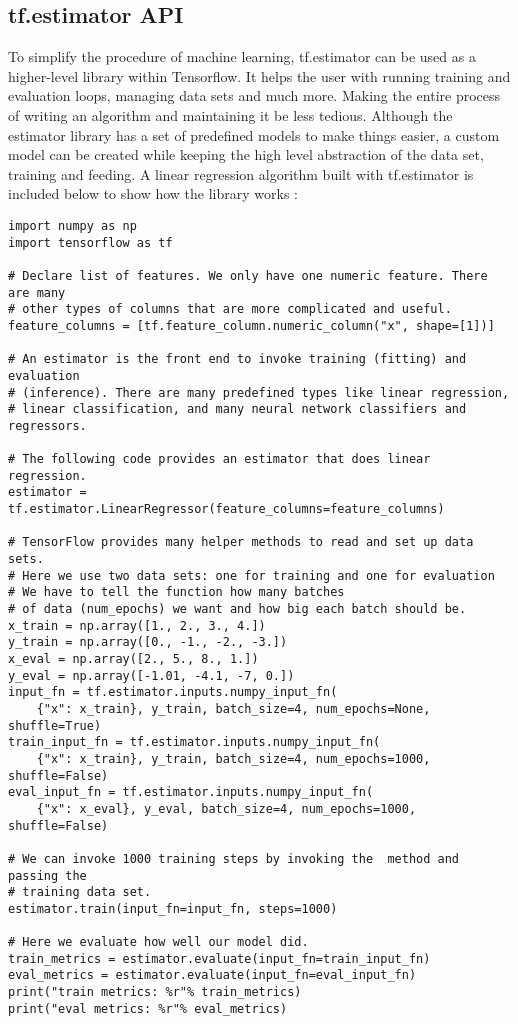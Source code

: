 \subsection{tf.estimator API}
To simplify the procedure of machine learning,
tf.estimator can be used as a higher-level library within Tensorflow.
It helps the user with running training and evaluation loops, managing data sets and much more. 
Making the entire process of writing an algorithm and maintaining it be less tedious.
Although the estimator library has a set of predefined models to make things easier, a custom model can be created while keeping the high
level abstraction of the data set, training and feeding.
A linear regression algorithm built with tf.estimator is included below
to show how the library works \cite{Estimator}:

\begin{lstlisting}
import numpy as np
import tensorflow as tf

# Declare list of features. We only have one numeric feature. There are many
# other types of columns that are more complicated and useful.
feature_columns = [tf.feature_column.numeric_column("x", shape=[1])]

# An estimator is the front end to invoke training (fitting) and evaluation
# (inference). There are many predefined types like linear regression,
# linear classification, and many neural network classifiers and regressors.

# The following code provides an estimator that does linear regression.
estimator = tf.estimator.LinearRegressor(feature_columns=feature_columns)

# TensorFlow provides many helper methods to read and set up data sets.
# Here we use two data sets: one for training and one for evaluation
# We have to tell the function how many batches
# of data (num_epochs) we want and how big each batch should be.
x_train = np.array([1., 2., 3., 4.])
y_train = np.array([0., -1., -2., -3.])
x_eval = np.array([2., 5., 8., 1.])
y_eval = np.array([-1.01, -4.1, -7, 0.])
input_fn = tf.estimator.inputs.numpy_input_fn(
    {"x": x_train}, y_train, batch_size=4, num_epochs=None, shuffle=True)
train_input_fn = tf.estimator.inputs.numpy_input_fn(
    {"x": x_train}, y_train, batch_size=4, num_epochs=1000, shuffle=False)
eval_input_fn = tf.estimator.inputs.numpy_input_fn(
    {"x": x_eval}, y_eval, batch_size=4, num_epochs=1000, shuffle=False)

# We can invoke 1000 training steps by invoking the  method and passing the
# training data set.
estimator.train(input_fn=input_fn, steps=1000)

# Here we evaluate how well our model did.
train_metrics = estimator.evaluate(input_fn=train_input_fn)
eval_metrics = estimator.evaluate(input_fn=eval_input_fn)
print("train metrics: %r"% train_metrics)
print("eval metrics: %r"% eval_metrics)
\end{lstlisting}

